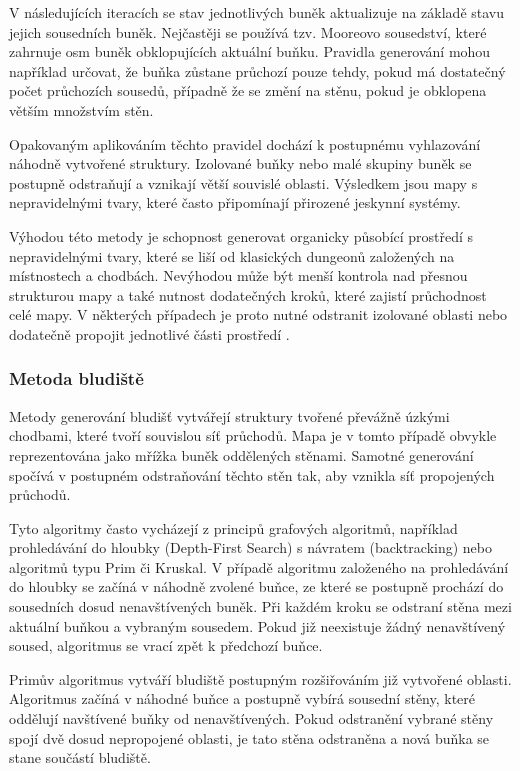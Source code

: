 \documentclass[
  program=itk,
  biblatex,
  figures=false,
  glossaries,
  index
]{kidiplom}
\begin{document}
V následujících iteracích se stav jednotlivých buněk aktualizuje na základě stavu jejich sousedních buněk. Nejčastěji se používá tzv. Mooreovo sousedství, které zahrnuje osm buněk obklopujících aktuální buňku. Pravidla generování mohou například určovat, že buňka zůstane průchozí pouze tehdy, pokud má dostatečný počet průchozích sousedů, případně že se změní na stěnu, pokud je obklopena větším množstvím stěn.

Opakovaným aplikováním těchto pravidel dochází k postupnému vyhlazování náhodně vytvořené struktury. Izolované buňky nebo malé skupiny buněk se postupně odstraňují a vznikají větší souvislé oblasti. Výsledkem jsou mapy s nepravidelnými tvary, které často připomínají přirozené jeskynní systémy.

Výhodou této metody je schopnost generovat organicky působící prostředí s nepravidelnými tvary, které se liší od klasických dungeonů založených na místnostech a chodbách. Nevýhodou může být menší kontrola nad přesnou strukturou mapy a také nutnost dodatečných kroků, které zajistí průchodnost celé mapy. V některých případech je proto nutné odstranit izolované oblasti nebo dodatečně propojit jednotlivé části prostředí \cite{Linden2014,Shaker2016}.

\subsubsection{Metoda bludiště}

Metody generování bludišť vytvářejí struktury tvořené převážně úzkými chodbami, které tvoří souvislou síť průchodů. Mapa je v tomto případě obvykle reprezentována jako mřížka buněk oddělených stěnami. Samotné generování spočívá v postupném odstraňování těchto stěn tak, aby vznikla síť propojených průchodů.

Tyto algoritmy často vycházejí z principů grafových algoritmů, například prohledávání do hloubky (Depth-First Search) s návratem (backtracking) nebo algoritmů typu Prim či Kruskal. V případě algoritmu založeného na prohledávání do hloubky se začíná v náhodně zvolené buňce, ze které se postupně prochází do sousedních dosud nenavštívených buněk. Při každém kroku se odstraní stěna mezi aktuální buňkou a vybraným sousedem. Pokud již neexistuje žádný nenavštívený soused, algoritmus se vrací zpět k předchozí buňce.

Primův algoritmus vytváří bludiště postupným rozšiřováním již vytvořené oblasti. Algoritmus začíná v náhodné buňce a postupně vybírá sousední stěny, které oddělují navštívené buňky od nenavštívených. Pokud odstranění vybrané stěny spojí dvě dosud nepropojené oblasti, je tato stěna odstraněna a nová buňka se stane součástí bludiště.
\end{document}
